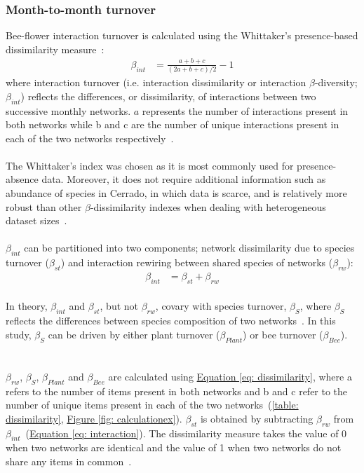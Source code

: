 \documentclass[11pt]{article}
\begin{document}
\subsubsection{Month-to-month turnover}
Bee-flower interaction turnover is calculated using the Whittaker's presence-based dissimilarity measure~\citep{Whittaker1960}: 
\begin{align}
	\beta_{int} & = \frac{a + b + c}{(2a + b + c)/2} - 1 
\label{eq: dissimilarity}
\end{align}
where interaction turnover (i.e. interaction dissimilarity or interaction $\beta$-diversity; $\beta_{int}$) reflects the differences, or dissimilarity, of interactions between two successive monthly networks. $a$ represents the number of interactions present in both networks while b and c are the number of unique interactions present in each of the two networks respectively~\citep{Poisot2012}. \\
\\
The Whittaker's index was chosen as it is most commonly used for presence-absence data. Moreover, it does not require additional information such as abundance of species in Cerrado, in which data is scarce, and is relatively more robust than other $\beta$-dissimilarity indexes when dealing with heterogeneous dataset sizes~\citep{Koleff2003, Poisot2012}. \\
\\
$\beta_{int}$ can be partitioned into two components; network dissimilarity due to species turnover ($\beta_{st}$) and interaction rewiring between shared species of networks ($\beta_{rw}$):
\begin{align}
	\beta_{int} & = \beta_{st} + \beta_{rw} 
\label{eq: interaction}
\end{align}
\vspace{0.1cm} \\
In theory, $\beta_{int}$ and $\beta_{st}$, but not $\beta_{rw}$, covary with species turnover, $\beta_{S}$, where $\beta_{S}$ reflects the differences between species composition of two networks~\citep{Poisot2012}. In this study, $\beta_{S}$ can be driven by either plant turnover ($\beta_{Plant}$) or bee turnover ($\beta_{Bee}$). \\
\\
\\
$\beta_{rw}$, $\beta_{S}$, $\beta_{Plant}$ and $\beta_{Bee}$ are calculated using \hyperref[eq: dissimilarity]{Equation \ref{eq: dissimilarity}}, where a refers to the number of items present in both networks and b and c refer to the number of unique items present in each of the two networks~(\autoref{table: dissimilarity}, \hyperref[fig: calculationex]{Figure \ref{fig: calculationex}}). $\beta_{st}$ is obtained by subtracting $\beta_{rw}$ from $\beta_{int}$~(\hyperref[eq: interaction]{Equation \ref{eq: interaction}}). The dissimilarity measure takes the value of 0 when two networks are identical and the value of 1 when two networks do not share any items in common~\citep{Poisot2012, CaraDonna2017}. \\
\end{document}

